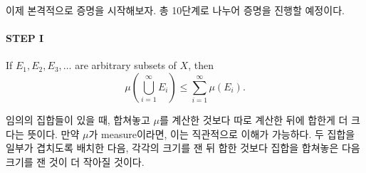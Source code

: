 \documentclass[11pt,reqno]{amsart}
\renewcommand{\(}{\left(}
\renewcommand{\)}{\right)}
\renewcommand{\[}{\left[}
\renewcommand{\]}{\right]}
\newenvironment{textbox}
  {\begin{tcolorbox}[
    colback=gray!10, 
    colframe=gray!50, 
    boxrule=0.5pt,
    fontupper=\normalfont
  ]}
  {\end{tcolorbox}}
\newcommand{\subheading}[1]{\vspace{1em}{\noindent\large\bfseries \textlangle{} #1 \textrangle{} \par}\vspace{1em}}
\begin{document}
이제 본격적으로 증명을 시작해보자. 총 10단계로 나누어 증명을 진행할 예정이다.

\paragraph{STEP I}

\begin{textbox}
  If $E_1, E_2, E_3, \dots$ are arbitrary subsets of $X$, then
  \begin{equation}
    \mu \( \bigcup _{i=1} ^\infty E_i \) \le \sum_{i=1} ^\infty \mu (E_i).
  \end{equation}
\end{textbox}

임의의 집합들이 있을 때, 합쳐놓고 $\mu$를 계산한 것보다 따로 계산한 뒤에 합한게 더 크다는 뜻이다. 만약 $\mu$가 
measure이라면, 이는 직관적으로 이해가 가능하다. 두 집합을 일부가 겹치도록 배치한 다음, 각각의 크기를 잰 뒤 합한 것보다
집합을 합쳐놓은 다음 크기를 잰 것이 더 작아질 것이다.

\subheading{proof}
\end{document}
